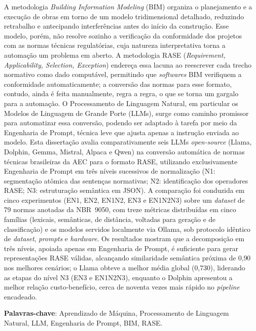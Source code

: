 \setlength{\absparsep}{18pt}

\begin{resumo}

A metodologia \textit{Building Information Modeling} (BIM) organiza o planejamento e a execução de obras em torno de um modelo tridimensional detalhado, reduzindo retrabalho e antecipando interferências antes do início da construção. Esse modelo, porém, não resolve sozinho a verificação da conformidade dos projetos com as normas técnicas regulatórias, cuja natureza interpretativa torna a automação um problema em aberto. A metodologia RASE (\textit{Requirement, Applicability, Selection, Exception}) endereça essa lacuna ao reescrever cada trecho normativo como dado computável, permitindo que \textit{softwares} BIM verifiquem a conformidade automaticamente; a conversão das normas para esse formato, contudo, ainda é feita manualmente, regra a regra, o que se torna um gargalo para a automação. O Processamento de Linguagem Natural, em particular os Modelos de Linguagem de Grande Porte (LLMs), surge como caminho promissor para automatizar essa conversão, podendo ser adaptado à tarefa por meio da Engenharia de Prompt, técnica leve que ajusta apenas a instrução enviada ao modelo. Esta dissertação avalia comparativamente seis LLMs \textit{open-source} (Llama, Dolphin, Gemma, Mistral, Alpaca e Qwen) na conversão automática de normas técnicas brasileiras da AEC para o formato RASE, utilizando exclusivamente Engenharia de Prompt em três níveis sucessivos de normalização (N1: segmentação atômica das sentenças normativas; N2: identificação dos operadores RASE; N3: estruturação semântica em JSON). A comparação foi conduzida em cinco experimentos (EN1, EN2, EN1N2, EN3 e EN1N2N3) sobre um \textit{dataset} de 79 normas anotadas da NBR~9050, com treze métricas distribuídas em cinco famílias (lexicais, semânticas, de distância, voltadas para geração e de classificação) e os modelos servidos localmente via Ollama, sob protocolo idêntico de \textit{dataset}, \textit{prompts} e \textit{hardware}. Os resultados mostram que a decomposição em três níveis, apoiada apenas em Engenharia de Prompt, é suficiente para gerar representações RASE válidas, alcançando similaridade semântica próxima de 0{,}90 nos melhores cenários; o Llama obteve a melhor média global (0{,}730), liderando as etapas do nível N3 (EN3 e EN1N2N3), enquanto o Dolphin apresentou a melhor relação custo-benefício, cerca de noventa vezes mais rápido no \textit{pipeline} encadeado.

\textbf{Palavras-chave}: Aprendizado de Máquina, Processamento de Linguagem Natural, LLM, Engenharia de Prompt, BIM, RASE.

\end{resumo}
